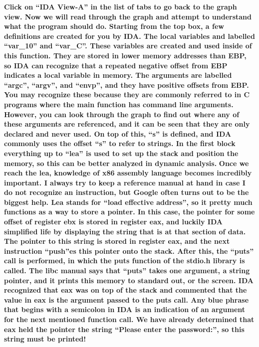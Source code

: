 \textbf{Click on ``IDA View-A'' in the list of tabs to go back to the graph view. Now we will read through the graph and
attempt to understand what the program should do. Starting from the top box, a few definitions are created for you by
IDA. The local variables and labelled ``var\_10'' and ``var\_C''. These variables are created and used inside of this
function. They are stored in lower memory addresses than EBP, so IDA can recognize that a repeated negative offset from
EBP indicates a local variable in memory. The arguments are labelled ``argc'', ``argv'', and ``envp'', and they have
positive offsets from EBP. You may recognize these because they are commonly referred to in C programs where the main
function has command line arguments. However, you can look through the graph to find out where any of these arguments
are referenced, and it can be seen that they are only declared and never used. On top of this, ``s'' is defined, and
IDA commonly uses the offset ``s'' to refer to strings. In the first block everything up to ``lea'' is used to set up
the stack and position the memory, so this can be better analyzed in dynamic analysis. }  
 \textbf{Once we reach the lea, knowledge of x86 assembly language becomes incredibly important. I always try to keep a
reference manual at hand in case I do not recognize an instruction, but Google often turns out to be the biggest help.
Lea stands for ``load effective address'', so it pretty much functions as a way to store a pointer. In this case, the
pointer for some offset of register ebx is stored in register eax, and luckily IDA simplified life by displaying the
string that is at that section of data. The pointer to this string is stored in register eax, and the next instruction
``push''es this pointer onto the stack. After this, the ``puts'' call is performed, in which the puts function of the
stdio.h library is called. The libc manual says that ``puts'' takes one argument, a string pointer, and it prints this
memory to standard out, or the screen. IDA recognized that eax was on top of the stack and commented that the value in
eax is the argument passed to the puts call. Any blue phrase that begins with a semicolon in IDA is an indication of an
argument for the next mentioned function call. We have already determined that eax held the pointer the string ``Please
enter the password:'', so this string must be printed!}

